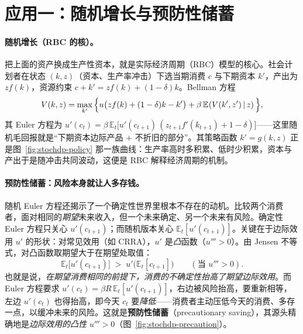 \section{应用一：随机增长与预防性储蓄}
\label{sec:stochdp-precaution}

\paragraph{随机增长（RBC 的核）。}
把上面的资产换成生产性资本，就是实际经济周期（RBC）模型的核心。社会计划者在状态 $(k,z)$（资本、生产率冲击）下选当期消费 $c$ 与下期资本 $k'$，产出为 $z f(k)$，资源约束 $c+k'=z f(k)+(1-\delta)k$。Bellman 方程
\[
    V(k,z)=\max_{k'}\Big\{u\big(zf(k)+(1-\delta)k-k'\big)+\beta\,\mathbb{E}_{}\!\left(V(k',z')\,\middle|\, z\right)\Big\},
\]
其 Euler 方程为 $u'(c_t)=\beta\,\mathbb{E}_t\big[u'(c_{t+1})\,(z_{t+1}f'(k_{t+1})+1-\delta)\big]$——这里随机毛回报就是``下期资本边际产品 $+$ 不折旧的部分''。其策略函数 $k'=g(k,z)$ 正是图~\ref{fig:stochdp-policy} 那一族曲线：生产率高时多积累、低时少积累，资本与产出于是随冲击共同波动，这便是 RBC 解释经济周期的机制。

\paragraph{预防性储蓄：风险本身就让人多存钱。}
随机 Euler 方程还揭示了一个确定性世界里根本不存在的动机。比较两个消费者，面对相同的\emph{期望}未来收入，但一个未来确定、另一个未来有风险。确定性 Euler 方程只关心 $u'(c_{t+1})$；而随机版本关心 $\mathbb{E}_t[u'(c_{t+1})]$。关键在于边际效用 $u'$ 的形状：对常见效用（如 CRRA），$u'$ 是\emph{凸}函数（$u'''>0$）。由 Jensen 不等式，对凸函数取期望大于在期望处取值：
\[
    \mathbb{E}_t\big[u'(c_{t+1})\big]\;>\;u'\big(\mathbb{E}_t[c_{t+1}]\big)\qquad(\text{当 }u'''>0).
\]
也就是说，\emph{在期望消费相同的前提下，消费的不确定性抬高了期望边际效用}。而 Euler 方程要求 $u'(c_t)=\beta R\,\mathbb{E}_t[u'(c_{t+1})]$，右边被风险抬高，要重新相等，左边 $u'(c_t)$ 也得抬高，即今天 $c_t$ 要\emph{降低}——消费者主动压低今天的消费、多存一点，以缓冲未来的风险。这就是\textbf{预防性储蓄}（precautionary saving），其源头精确地是\emph{边际效用的凸性} $u'''>0$（图~\ref{fig:stochdp-precaution}）。


